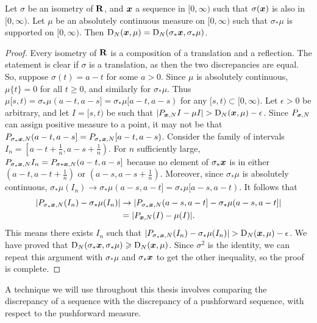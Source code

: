 \begin{lemma}\label{lem:flip-discrepancy}
Let $\sigma$ be an isometry of $\mathbf{R}$, and ${\boldsymbol x}$ a sequence in $[0,\infty)$ 
such that $\sigma({\boldsymbol x})$ is also in $[0,\infty)$. Let $\mu$ be an absolutely 
continuous measure on $[0,\infty)$ such that $\sigma_\ast \mu$ is supported on 
$[0,\infty)$. Then $\operatorname{D}_N({\boldsymbol x}, \mu) = \operatorname{D}_N(\sigma_\ast {\boldsymbol x}, \sigma_\ast \mu)$. 
\end{lemma}
\begin{proof}
Every isometry of $\mathbf{R}$ is a composition of a translation and a reflection. 
The statement is clear if $\sigma$ is a translation, as then the two 
discrepancies are equal. So, suppose $\sigma(t) = a - t$ for some $a>0$. Since 
$\mu$ is absolutely continuous, $\mu\{t\}=0$ for all $t\geqslant 0$, and 
similarly for $\sigma_\ast\mu$. Thus 
$\mu[s,t) = \sigma_\ast\mu(a-t,a-s] = \sigma_\ast\mu[a-t,a-s)$ for any 
$[s,t)\subset [0,\infty)$. Let $\epsilon>0$ be arbitrary, and let 
$I = [s,t)$ be such that $|P_{{\boldsymbol x},N}I - \mu I| > \operatorname{D}_N({\boldsymbol x},\mu) - \epsilon$. 
Since $P_{{\boldsymbol x},N}$ can assign positive measure to a point, it may not be that 
$P_{\sigma_\ast {\boldsymbol x},N}(a-t,a-s] = P_{\sigma_\ast {\boldsymbol x},N}[a-t,a-s)$. Consider the 
family of intervals $I_n = \left[a-t+\frac 1 n, a-s+\frac 1 n\right)$. For 
$n$ sufficiently large, 
$P_{\sigma_\ast{\boldsymbol x},N}I_n = P_{\sigma\ast{\boldsymbol x},N}(a-t,a-s]$ because no element of 
$\sigma_\ast{\boldsymbol x}$ is in either $\left(a-t,a-t+\frac 1 n\right)$ or 
$\left(a-s,a-s+\frac 1 n\right)$. Moreover, since $\sigma_\ast\mu$ is absolutely 
continuous, 
$\sigma_\ast\mu(I_n) \to \sigma_\ast\mu(a-s,a-t] = \sigma_\ast\mu[a-s,a-t)$. 
It follows that 
\begin{align*}
	|P_{\sigma_\ast{\boldsymbol x},N}(I_n) - \sigma_\ast\mu(I_n)| 
		&\to |P_{\sigma_\ast{\boldsymbol x},N}(a-s,a-t] - \sigma_\ast\mu(a-s,a-t]| \\
		&= |P_{{\boldsymbol x},N}(I) - \mu(I)| .
\end{align*}
This means there exists $I_n$ such that 
$|P_{\sigma_\ast\bx,N}(I_n) - \sigma_\ast\mu(I_n)|> \D_N(\bx,\mu) - \epsilon$. 
We have proved that 
$\operatorname{D}_N(\sigma_\ast{\boldsymbol x},\sigma_\ast\mu) \geqslant \operatorname{D}_N({\boldsymbol x},\mu)$. Since $\sigma^2$ 
is the identity, we can repeat this argument with $\sigma_\ast\mu$ and 
$\sigma_\ast{\boldsymbol x}$ to get the other inequality, so the proof is complete. 
\end{proof}

A technique we will use throughout this thesis involves comparing the 
discrepancy of a sequence with the discrepancy of a pushforward sequence, 
with respect to the pushforward measure. 

